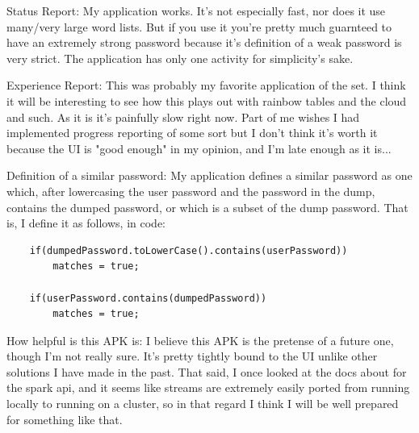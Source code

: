 \documentclass{article}
\begin{document}
Status Report: My application works. 
It's not especially fast, nor does it use many/very large word lists.
But if you use it you're pretty much guarnteed to have an extremely strong password because it's definition of a weak password is very strict. The application has only one activity for simplicity's sake.

Experience Report: This was probably my favorite application of the set.
I think it will be interesting to see how this plays out with rainbow tables and the cloud and such. As it is it's painfully slow right now.
Part of me wishes I had implemented progress reporting of some sort but I don't think it's worth it because the UI is "good enough" in my opinion, and I'm late enough as it is...

Definition of a similar password: My application defines a similar password as one which, after lowercasing the user password and the password in the dump, contains the dumped password, or which is a subset of the dump password. That is, I define it as follows, in code:

\begin{verbatim}
    if(dumpedPassword.toLowerCase().contains(userPassword))
        matches = true;

    if(userPassword.contains(dumpedPassword))
        matches = true;
\end{verbatim}

How helpful is this APK is: I believe this APK is the pretense of a future one, though I'm not really sure. It's pretty tightly bound to the UI unlike other solutions I have made in the past.
That said, I once looked at the docs about for the spark api, and it seems like streams are extremely easily ported from running locally to running on a cluster, so in that regard I think I will be well prepared for something like that.
\end{document}
